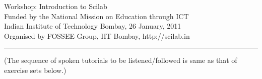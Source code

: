 \documentclass[12pt,a4paper]{article}
\begin{document}
\begin{center}
{\Large Workshop: Introduction to Scilab}
\\
 \vspace{5pt}
{\large Funded by the National Mission on Education through ICT}
\\
Indian Institute of Technology Bombay, 
26 January, 2011\\ 
Organised by FOSSEE Group, IIT Bombay, http://scilab.in
\\
\rule{\linewidth}{1pt}
(The sequence of spoken tutorials to be listened/followed is same as that of exercise sets below.)
\end{center}
\end{document}
